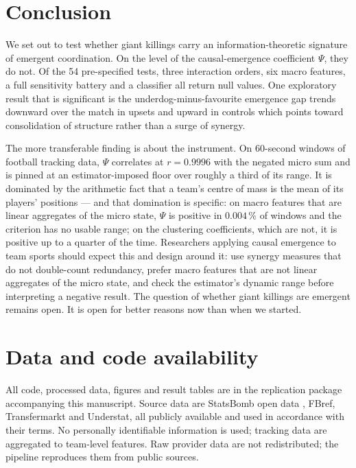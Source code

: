 \documentclass[11pt,a4paper]{article}
\begin{document}
\section{Conclusion}

We set out to test whether giant killings carry an information-theoretic signature of
emergent coordination. On the level of the causal-emergence coefficient $\Psi$, they do
not. Of the 54 pre-specified tests, three interaction orders, six macro features, a full
sensitivity battery and a classifier all return null values. One exploratory result that is significant is the underdog-minus-favourite emergence gap trends downward over the match in upsets and
upward in controls which points toward consolidation of structure rather than a surge
of synergy.

The more transferable finding is about the instrument. On 60-second windows of football
tracking data, $\Psi$ correlates at $r=0.9996$ with the negated micro sum and is pinned at
an estimator-imposed floor over roughly a third of its range. It is dominated by the
arithmetic fact that a team's centre of mass is the mean of its players' positions --- and
that domination is specific: on macro features that are linear aggregates of the micro
state, $\Psi$ is positive in $0.004\,\%$ of windows and the criterion has no usable range;
on the clustering coefficients, which are not, it is positive up to a quarter of the time.
Researchers applying causal emergence to team sports should expect this and design around
it: use synergy measures that do not double-count redundancy, prefer macro features that
are not linear aggregates of the micro state, and check the estimator's dynamic range
before interpreting a negative result. The question of whether giant killings are emergent
remains open. It is open for better reasons now than when we started.

\section*{Data and code availability}

All code, processed data, figures and result tables are in the replication package
accompanying this manuscript. Source data are StatsBomb open data \cite{statsbomb},
FBref, Transfermarkt and Understat, all publicly available and used in accordance with
their terms. No personally identifiable information is used; tracking data are aggregated
to team-level features. Raw provider data are not redistributed; the pipeline reproduces
them from public sources.
\end{document}
